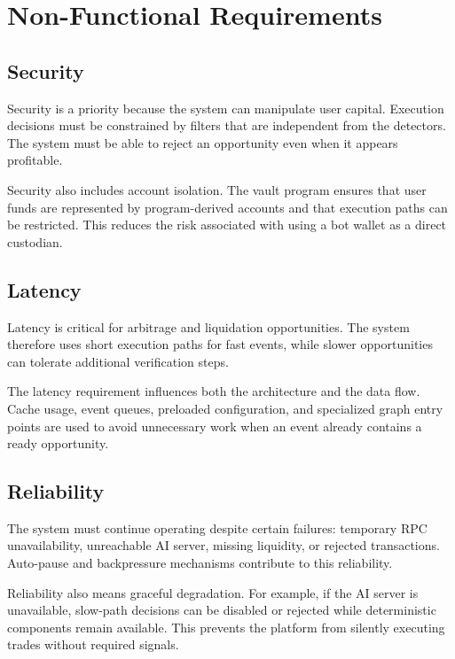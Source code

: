 \documentclass[12pt,a4paper]{report}
\begin{document}
\section{Non-Functional Requirements}

\subsection{Security}

Security is a priority because the system can manipulate user capital. Execution decisions must be constrained by filters that are independent from the detectors. The system must be able to reject an opportunity even when it appears profitable.

Security also includes account isolation. The vault program ensures that user funds are represented by program-derived accounts and that execution paths can be restricted. This reduces the risk associated with using a bot wallet as a direct custodian.

\subsection{Latency}

Latency is critical for arbitrage and liquidation opportunities. The system therefore uses short execution paths for fast events, while slower opportunities can tolerate additional verification steps.

The latency requirement influences both the architecture and the data flow. Cache usage, event queues, preloaded configuration, and specialized graph entry points are used to avoid unnecessary work when an event already contains a ready opportunity.

\subsection{Reliability}

The system must continue operating despite certain failures: temporary RPC unavailability, unreachable AI server, missing liquidity, or rejected transactions. Auto-pause and backpressure mechanisms contribute to this reliability.

Reliability also means graceful degradation. For example, if the AI server is unavailable, slow-path decisions can be disabled or rejected while deterministic components remain available. This prevents the platform from silently executing trades without required signals.
\end{document}
